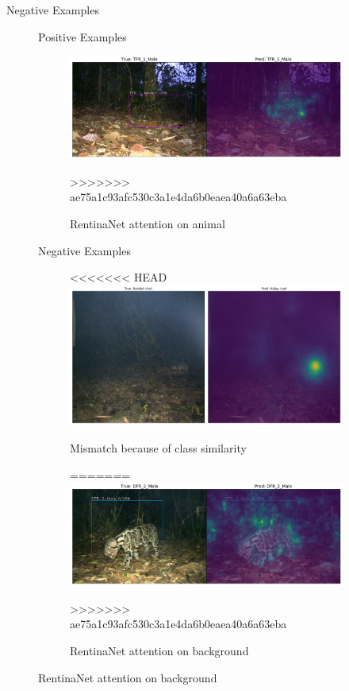 \documentclass[10pt]{beamer}
\begin{document}
\begin{frame}{Negative Examples}
\begin{figure}
\begin{frame}{Positive Examples}
	\centering
	\begin{figure}
		\includegraphics[width=\columnwidth]{images/RetinaNet_Attention_correct_good_quality2.png}
		\caption{RentinaNet attention on animal}
>>>>>>> ae75a1c93afc530c3a1e4da6b0eaea40a6a63eba
	\end{figure}
\end{frame}


\begin{frame}{Negative Examples}
	\centering
	\begin{figure}
<<<<<<< HEAD
		\includegraphics[width=\columnwidth]{images/mismatch.png}
		\caption{Mismatch because of class similarity}
=======
		\includegraphics[width=\columnwidth]{images/RetinaNet_No_Attention_correct2.png}
		\caption{RentinaNet attention on background}
>>>>>>> ae75a1c93afc530c3a1e4da6b0eaea40a6a63eba
	\end{figure}
\end{frame}


\end{figure}
\end{frame}
\end{document}
